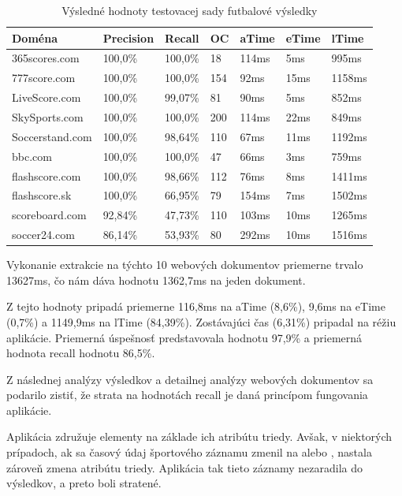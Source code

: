 \begin{table}[hbt]
\caption{Výsledné hodnoty testovacej sady futbalové výsledky}
\centering
\begin{tabular}{|l|l|l|l|l|l|l|}
\hline
\textbf{Doména}          & \textbf{Precision} & \textbf{Recall}  & \textbf{OC}  & \textbf{aTime} & \textbf{eTime} & \textbf{lTime}  \\ \hline
365scores.com   & 100,0\%   & 100,0\% & 18  & 114ms & 5ms   & 995ms  \\ \hline
777score.com    & 100,0\%   & 100,0\% & 154 & 92ms  & 15ms  & 1158ms \\ \hline
LiveScore.com   & 100,0\%   & 99,07\% & 81  & 90ms  & 5ms   & 852ms  \\ \hline
SkySports.com   & 100,0\%   & 100,0\% & 200 & 114ms & 22ms  & 849ms  \\ \hline
Soccerstand.com & 100,0\%   & 98,64\% & 110 & 67ms  & 11ms  & 1192ms \\ \hline
bbc.com         & 100,0\%   & 100,0\% & 47  & 66ms  & 3ms   & 759ms  \\ \hline
flashscore.com  & 100,0\%   & 98,66\% & 112 & 76ms  & 8ms   & 1411ms \\ \hline
flashscore.sk   & 100,0\%   & 66,95\% & 79  & 154ms & 7ms   & 1502ms \\ \hline
scoreboard.com  & 92,84\%   & 47,73\% & 110 & 103ms & 10ms  & 1265ms \\ \hline
soccer24.com    & 86,14\%   & 53,93\% & 80  & 292ms & 10ms  & 1516ms \\ \hline
\end{tabular}
\end{table}

Vykonanie extrakcie na týchto 10 webových dokumentov priemerne trvalo 13627ms, čo nám dáva hodnotu 1362,7ms na jeden dokument. 

Z tejto hodnoty pripadá priemerne 116,8ms na aTime (8,6\%), 9,6ms na eTime (0,7\%) a 1149,9ms na lTime (84,39\%). Zostávajúci čas (6,31\%) pripadal na réžiu aplikácie. Priemerná úspešnosť predstavovala hodnotu 97,9\% a priemerná hodnota recall hodnotu 86,5\%. 

\bigskip

Z následnej analýzy výsledkov a detailnej analýzy webových dokumentov sa podarilo zistiť, že strata na hodnotách recall je daná princípom fungovania aplikácie.

Aplikácia združuje elementy na základe ich atribútu triedy. Avšak, v niektorých prípadoch, ak sa časový údaj športového záznamu zmenil na  alebo ,  nastala zároveň zmena atribútu triedy. Aplikácia tak tieto záznamy nezaradila do výsledkov, a preto boli stratené.

